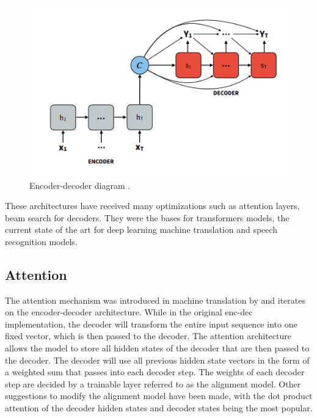 \documentclass{kththesis}
\begin{document}
\begin{figure}[H]
    \centering
    \includegraphics[scale=0.6]{images/background/encoder.PNG}
    \caption{Encoder-decoder diagram \cite{attentionplots}.}
\end{figure}

These architectures have received many optimizations such as attention layers, beam search for decoders. They were the bases for transformers models, the current state of the art for deep learning machine translation and speech recognition models.

\subsection{Attention}
The attention mechanism was introduced in machine translation by \cite{attention} and iterates on the encoder-decoder architecture. While in the original enc-dec implementation, the decoder will transform the entire input sequence into one fixed vector, which is then passed to the decoder. The attention architecture allows the model to store all hidden states of the decoder that are then passed to the decoder. The decoder will use all previous hidden state vectors in the form of a weighted sum that passes into each decoder step. The weights of each decoder step are decided by a trainable layer referred to as the alignment model. Other suggestions to modify the alignment model have been made, with the dot product attention of the decoder hidden states and decoder states being the most popular.
\end{document}

